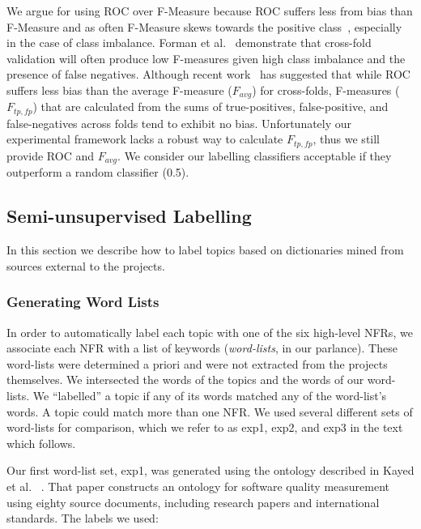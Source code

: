 \documentclass[smallextended]{svjour3}       %
\begin{document}
We argue for using ROC over F-Measure because ROC suffers less from
bias than F-Measure and as often F-Measure skews towards the positive
class~\cite{flach-icml03,Forman:2010:ACS:1882471.1882479}, especially
in the case of class imbalance. Forman et
al.~\cite{Forman:2010:ACS:1882471.1882479} demonstrate that cross-fold
validation will often produce low F-measures given high class
imbalance and the presence of false negatives.
Although
recent work~\cite{Forman:2010:ACS:1882471.1882479} has suggested that while ROC suffers less bias than
the average F-measure ($F_{avg}$) for cross-folds, F-measures ($F_{tp,fp}$) that are calculated from
the sums of true-positives,
false-positive, and false-negatives across folds tend to exhibit no
bias. Unfortunately our experimental framework lacks a robust way to
calculate $F_{tp,fp}$, thus we still provide ROC and $F_{avg}$.
We consider our labelling classifiers acceptable if they outperform a random classifier (0.5). 


\subsection{Semi-unsupervised Labelling}
\label{sec:unsuplabelling}

In this section we describe how to label topics based on dictionaries
mined from sources external to the projects.


\subsubsection{Generating Word Lists}


In order to automatically label each topic with 
one of the six high-level NFRs,
we associate each NFR with a list
of keywords (\emph{word-lists}, in our parlance). These word-lists were determined a priori and were not extracted from the projects themselves.
We intersected the words of the topics and the words of our word-lists.
We ``labelled'' a topic if any of its words matched any of the word-list's words.
A topic could match more than one NFR.
We used several different sets of word-lists for comparison, which we
refer to as \textsf{exp1}, \textsf{exp2}, and \textsf{exp3} in the text which follows. 

Our first word-list set, \textsf{exp1}, was generated using the ontology described in Kayed et al.~\cite{5072519} .
That paper constructs an ontology for software quality measurement using eighty source documents, including research papers and international standards. 
The labels we used:
\end{document}
